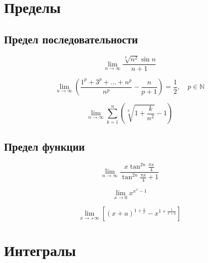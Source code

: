 \documentclass[a4paper,14pt]{article}
\begin{document}
\tableofcontents
\newpage

\setcounter{equation}{47}

\section{Пределы}

\cite{art1,art3,art2,art5}

\subsection{Предел последовательности}


\begin{equation}
\lim_{n \to \infty}\frac{\sqrt[3]{n^2}\sin n}{n+1}
\end{equation}

\setcounter{equation}{144}

\begin{equation}
\lim_{n \to \infty} \left(\frac{1^p+3^p+\dots+n^p}{n^p}-\frac{n}{p+1}\right)=\frac{1}{2}, \quad p\in\mathbb{N}
\end{equation}

\setcounter{equation}{631}

\begin {equation}
\lim_{n \to \infty}\sum\limits_{k=1}^{n} \left(\sqrt[3]{1+\frac{k}{n^2}}-1\right)
\end{equation}


\subsection{Предел функции}

\setcounter{equation}{624}

\begin{equation}
\lim_{n \to \infty} \frac{ x\tan^{2n}\frac{\pi x}{4}}{\tan^{2n}\frac{\pi x}{4} + 1}
\end{equation}

\setcounter{equation}{1342}
\begin{equation}
\lim_{x \to 0} x^{x^{x}-1}
\end{equation}

\setcounter{equation}{1369}
\begin{equation}
\lim_{x \to +\infty} \left[ \left(x+a\right)^{1+\frac{1}{x}} - x^{1+\frac{1}{x+a}}\right]
\end{equation}

\section{Интегралы}
\end{document}
